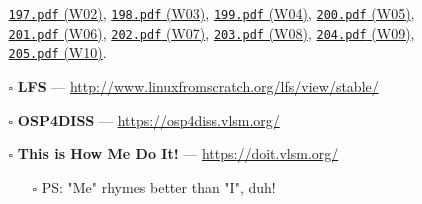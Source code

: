 \begin{frame}[fragile]
\begin{itemize}
\begin{itemize}
{                 \href{https://rms46.vlsm.org/2/197.pdf}{\texttt{197.pdf} (W02)},
                 \href{https://rms46.vlsm.org/2/198.pdf}{\texttt{198.pdf} (W03)},
                 \href{https://rms46.vlsm.org/2/199.pdf}{\texttt{199.pdf} (W04)},
                 \href{https://rms46.vlsm.org/2/200.pdf}{\texttt{200.pdf} (W05)},\\
                 \href{https://rms46.vlsm.org/2/201.pdf}{\texttt{201.pdf} (W06)},
                 \href{https://rms46.vlsm.org/2/202.pdf}{\texttt{202.pdf} (W07)},
                 \href{https://rms46.vlsm.org/2/203.pdf}{\texttt{203.pdf} (W08)},
                 \href{https://rms46.vlsm.org/2/204.pdf}{\texttt{204.pdf} (W09)},
                 \href{https://rms46.vlsm.org/2/205.pdf}{\texttt{205.pdf} (W10)}.}
\item[$\square$] \textbf{LFS} --- \url{http://www.linuxfromscratch.org/lfs/view/stable/}
\item[$\square$] \textbf{OSP4DISS} --- \url{https://osp4diss.vlsm.org/}
\item[$\square$] \textbf{This is How Me Do It!} --- \url{https://doit.vlsm.org/}
\begin{itemize}
\item[$\square$] PS: "Me" rhymes better than "I", duh!
\end{itemize}
\end{itemize}
\end{itemize}
\end{frame}

